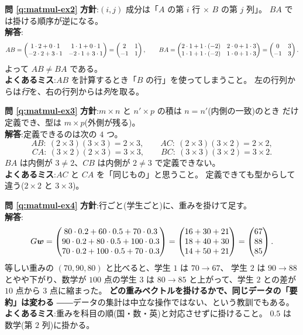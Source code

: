 \bigskip
\noindent\textbf{問 \ref{q:matmul-ex2}}\quad
\textbf{方針}:$(i,j)$ 成分は「$A$ の第 $i$ 行 $\times$ $B$ の第 $j$ 列」。
$BA$ では掛ける順序が逆になる。\\
\textbf{解答}:
\[
AB = \begin{pmatrix}1 \cdot 2 + 0 \cdot 1 & 1 \cdot 1 + 0 \cdot 1 \\
-2 \cdot 2 + 3 \cdot 1 & -2 \cdot 1 + 3 \cdot 1\end{pmatrix} = \begin{pmatrix}2 & 1 \\ -1 & 1\end{pmatrix},
\qquad
BA = \begin{pmatrix}2 \cdot 1 + 1 \cdot (-2) & 2 \cdot 0 + 1 \cdot 3 \\
1 \cdot 1 + 1 \cdot (-2) & 1 \cdot 0 + 1 \cdot 3\end{pmatrix} = \begin{pmatrix}0 & 3 \\ -1 & 3\end{pmatrix}.
\]
よって $AB \neq BA$ である。\\
\textbf{よくあるミス}:$AB$ を計算するとき「$B$ の行」を使ってしまうこと。
左の行列からは\emph{行}を、右の行列からは\emph{列}を取る。

\bigskip
\noindent\textbf{問 \ref{q:matmul-ex3}}\quad
\textbf{方針}:$m \times n$ と $n' \times p$ の積は $n = n'$(内側の一致)のとき
だけ定義でき、型は $m \times p$(外側が残る)。\\
\textbf{解答}:定義できるのは次の $4$ つ。
\[
AB:\ (2 \times 3)(3 \times 3) = 2 \times 3, \qquad
AC:\ (2 \times 3)(3 \times 2) = 2 \times 2,
\]
\[
CA:\ (3 \times 2)(2 \times 3) = 3 \times 3, \qquad
BC:\ (3 \times 3)(3 \times 2) = 3 \times 2.
\]
$BA$ は内側が $3 \ne 2$、$CB$ は内側が $2 \ne 3$ で定義できない。\\
\textbf{よくあるミス}:$AC$ と $CA$ を「同じもの」と思うこと。
定義できても型からして違う($2 \times 2$ と $3 \times 3$)。

\bigskip
\noindent\textbf{問 \ref{q:matmul-ex4}}\quad
\textbf{方針}:行ごと(学生ごと)に、重みを掛けて足す。\\
\textbf{解答}:
\[
G\bm{w} = \begin{pmatrix}80 \cdot 0.2 + 60 \cdot 0.5 + 70 \cdot 0.3 \\
90 \cdot 0.2 + 80 \cdot 0.5 + 100 \cdot 0.3 \\
70 \cdot 0.2 + 100 \cdot 0.5 + 70 \cdot 0.3\end{pmatrix}
= \begin{pmatrix}16 + 30 + 21 \\ 18 + 40 + 30 \\ 14 + 50 + 21\end{pmatrix}
= \begin{pmatrix}67 \\ 88 \\ 85\end{pmatrix}.
\]
等しい重みの $(70, 90, 80)$ と比べると、学生 $1$ は $70 \to 67$、
学生 $2$ は $90 \to 88$ とやや下がり、数学が $100$ 点の学生 $3$ は
$80 \to 85$ と上がって、学生 $2$ との差が $10$ 点から $3$ 点に縮まった。
\textbf{どの重みベクトルを掛けるかで、同じデータの「要約」は変わる}
――データの集計は中立な操作ではない、という教訓でもある。\\
\textbf{よくあるミス}:重みを科目の順(国・数・英)と対応させずに掛けること。
$0.5$ は数学(第 $2$ 列)に掛かる。

